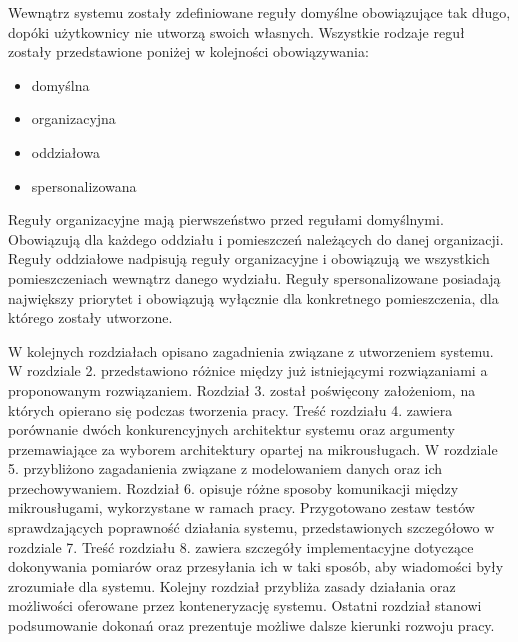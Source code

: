 Wewnątrz systemu zostały zdefiniowane reguły domyślne obowiązujące tak długo, dopóki
użytkownicy nie utworzą swoich własnych. Wszystkie rodzaje reguł zostały przedstawione 
poniżej w kolejności obowiązywania:

\begin{itemize}
    \item domyślna
    \item organizacyjna
    \item oddziałowa
    \item spersonalizowana
\end{itemize}

Reguły organizacyjne mają pierwszeństwo przed regułami domyślnymi. Obowiązują dla
każdego oddziału i pomieszczeń należących do danej organizacji. Reguły oddziałowe
nadpisują reguły organizacyjne i obowiązują we wszystkich pomieszczeniach wewnątrz
danego wydziału. Reguły spersonalizowane posiadają największy priorytet i obowiązują
wyłącznie dla konkretnego pomieszczenia, dla którego zostały utworzone.

W kolejnych rozdziałach opisano zagadnienia związane z utworzeniem systemu. W rozdziale 2. 
przedstawiono różnice między już istniejącymi rozwiązaniami a proponowanym rozwiązaniem. 
Rozdział 3. został poświęcony założeniom, na których opierano się podczas tworzenia pracy. 
Treść rozdziału 4. zawiera porównanie dwóch konkurencyjnych architektur systemu oraz
argumenty przemawiające za wyborem architektury opartej na mikrousługach.
W rozdziale 5. przybliżono zagadanienia związane z modelowaniem danych oraz ich 
przechowywaniem. Rozdział 6. opisuje różne sposoby komunikacji między 
mikrousługami, wykorzystane w ramach pracy. Przygotowano zestaw testów sprawdzających
poprawność działania systemu, przedstawionych szczegółowo w rozdziale 7.
Treść rozdziału 8. zawiera szczegóły implementacyjne dotyczące dokonywania pomiarów
oraz przesyłania ich w taki sposób, aby wiadomości były zrozumiałe dla systemu.
Kolejny rozdział przybliża zasady działania oraz możliwości oferowane przez konteneryzację
systemu. Ostatni rozdział stanowi podsumowanie dokonań oraz prezentuje możliwe
dalsze kierunki rozwoju pracy.